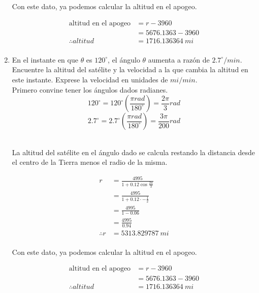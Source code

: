 \documentclass[12pt]{article}
\begin{document}
\begin{enumerate}
Con este dato, ya podemos calcular la altitud en el apogeo.

\begin{equation*}
  \begin{split}
    \text{altitud en el apogeo}
    &= r - 3960 \\
    &=  5676.1363 - 3960\\
    \therefore
    altitud
    &= 1716.136364 ~ mi \\
  \end{split}
\end{equation*}

\item En el instante en que $\theta$ es $120^{\circ}$, el ángulo $\theta$ aumenta a razón de $2.7^{\circ} /min$. Encuentre la altitud del satélite y la velocidad a la que cambia la altitud en este instante. Exprese la velocidad en unidades de $mi/min$.\\
Primero convine tener los ángulos dados radianes.
  \[
  120^{\circ} =  120^{\circ} \left( \frac{\pi rad}{180 ^{\circ}} \right) = \frac{2\pi}{3} rad
  \]
   \[
  2.7^{\circ} =  2.7^{\circ} \left( \frac{\pi rad}{180 ^{\circ}} \right) = \frac{3\pi}{200} rad
   \]

   \\La altitud del satélite en el ángulo dado se calcula restando la distancia desde el centro de la Tierra menos el radio de la misma.

   \begin{equation*}
  \begin{split}
    r
    &= \frac{4995}{1+0.12\cos{\frac{2\pi}{3}}}\\
    &= \frac{4995}{1+0.12\cdot - \frac{1}{2}}\\
    &= \frac{4995}{1 - 0.06}\\
    &= \frac{4995}{0.94}\\
    \therefore
    r
    &= 5313.829787 ~ mi \\
  \end{split}
\end{equation*}

Con este dato, ya podemos calcular la altitud en el apogeo.

\begin{equation*}
  \begin{split}
    \text{altitud en el apogeo}
    &= r - 3960 \\
    &=  5676.1363 - 3960\\
    \therefore
    altitud
    &= 1716.136364 ~ mi \\
  \end{split}
\end{equation*}


\end{enumerate}
\end{document}
